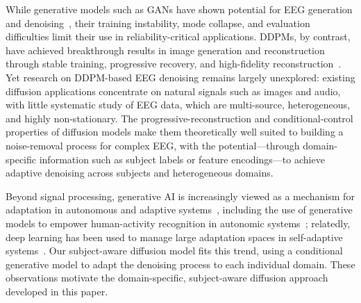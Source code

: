 While generative models such as GANs have shown potential for EEG generation and
denoising~\cite{hartmann2018eeggan,an2022autodenoising,lin2020bcg}, their
training instability, mode collapse, and evaluation difficulties limit their use
in reliability-critical applications. DDPMs, by contrast, have achieved
breakthrough results in image generation and reconstruction through stable
training, progressive recovery, and high-fidelity
reconstruction~\cite{ho2020ddpm,pan2022medical,pan2023synthesis,azqadan2023microstructure,lugmayr2022repaint}. Yet research on DDPM-based EEG denoising
remains largely unexplored: existing diffusion applications concentrate on
natural signals such as images and audio, with little systematic study of EEG
data, which are multi-source, heterogeneous, and highly non-stationary. The
progressive-reconstruction and conditional-control properties of diffusion
models make them theoretically well suited to building a noise-removal process
for complex EEG, with the potential---through domain-specific information such
as subject labels or feature encodings---to achieve adaptive denoising across
subjects and heterogeneous domains.

Beyond signal processing, generative AI is increasingly viewed as a mechanism for
adaptation in autonomous and adaptive systems~\cite{li2024genai}, including the
use of generative models to empower human-activity recognition in autonomic
systems~\cite{xu2026activity}; relatedly, deep learning has been used to manage
large adaptation spaces in self-adaptive systems~\cite{weyns2022deeplearning}.
Our subject-aware diffusion model fits this trend, using a conditional generative
model to adapt the denoising process to each individual domain. These
observations motivate the domain-specific, subject-aware diffusion approach
developed in this paper.
